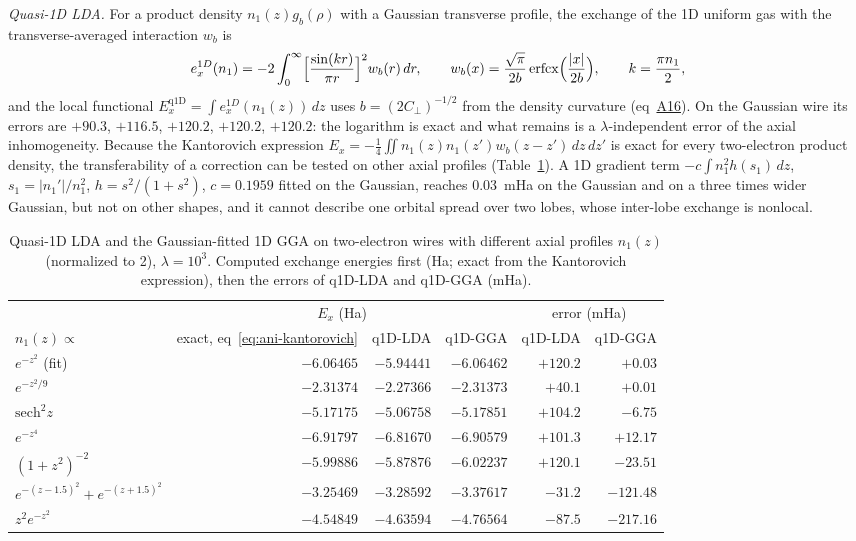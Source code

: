 \documentclass[journal=jctcce,manuscript=suppinfo]{achemso}
\begin{document}
\emph{Quasi-1D LDA.}  For a product density $n_1(z)g_b(\rho)$ with a
Gaussian transverse profile, the exchange of the 1D uniform gas with the
transverse-averaged interaction $w_b$ is
\begin{equation}
e_x^{1D}(n_1)=-2\int_0^\infty\Bigl[\frac{\sin(kr)}{\pi r}\Bigr]^2w_b(r)\,dr,\qquad
w_b(x)=\frac{\sqrt\pi}{2b}\,\mathrm{erfcx}\Bigl(\frac{|x|}{2b}\Bigr),\qquad k=\frac{\pi n_1}{2},
\end{equation}
and the local functional $E_x^{\mathrm{q1D}}=\int e_x^{1D}(n_1(z))\,dz$ uses
$b=(2C_\perp)^{-1/2}$ from the density curvature (eq~\href{main.pdf\#equation.16}{A16}).  On the
Gaussian wire its errors are $+90.3$, $+116.5$, $+120.2$, $+120.2$, $+120.2$:
the logarithm is exact and what remains is a $\lambda$-independent error of
the axial inhomogeneity.  Because the Kantorovich expression
$E_x=-\frac14\iint n_1(z)n_1(z')w_b(z-z')\,dz\,dz'$ is exact for every
two-electron product density, the transferability of a correction can be
tested on other axial profiles (Table~\ref{tab:dcscan-q1d}).  A 1D gradient
term $-c\int n_1^2h(s_1)\,dz$, $s_1=|n_1'|/n_1^2$, $h=s^2/(1+s^2)$,
$c=0.1959$ fitted on the Gaussian, reaches 0.03~mHa on the Gaussian and on a
three times wider Gaussian, but not on other shapes, and it cannot describe
one orbital spread over two lobes, whose inter-lobe exchange is nonlocal.

\begin{table}[H]
\centering
\caption{Quasi-1D LDA and the Gaussian-fitted 1D GGA on two-electron wires with
  different axial profiles $n_1(z)$ (normalized to 2), $\lambda=10^3$.  Computed
  exchange energies first (Ha; exact from the Kantorovich expression), then the
  errors of q1D-LDA and q1D-GGA (mHa).}
\label{tab:dcscan-q1d}
\scriptsize
\begin{tabular}{@{}l|rrr|rr@{}}
\toprule
 & \multicolumn{3}{c|}{$E_x$ (Ha)} & \multicolumn{2}{c}{error (mHa)} \\
$n_1(z)\propto$ & exact, eq~\ref{eq:ani-kantorovich} & q1D-LDA & q1D-GGA & q1D-LDA & q1D-GGA \\
\midrule
$e^{-z^2}$ (fit) & $-6.06465$ & $-5.94441$ & $-6.06462$ & $+120.2$ & $+0.03$ \\
$e^{-z^2/9}$ & $-2.31374$ & $-2.27366$ & $-2.31373$ & $+40.1$ & $+0.01$ \\
$\mathrm{sech}^2z$ & $-5.17175$ & $-5.06758$ & $-5.17851$ & $+104.2$ & $-6.75$ \\
$e^{-z^4}$ & $-6.91797$ & $-6.81670$ & $-6.90579$ & $+101.3$ & $+12.17$ \\
$(1+z^2)^{-2}$ & $-5.99886$ & $-5.87876$ & $-6.02237$ & $+120.1$ & $-23.51$ \\
$e^{-(z-1.5)^2}+e^{-(z+1.5)^2}$ & $-3.25469$ & $-3.28592$ & $-3.37617$ & $-31.2$ & $-121.48$ \\
$z^2e^{-z^2}$ & $-4.54849$ & $-4.63594$ & $-4.76564$ & $-87.5$ & $-217.16$ \\

\bottomrule
\end{tabular}
\end{table}
\end{document}

